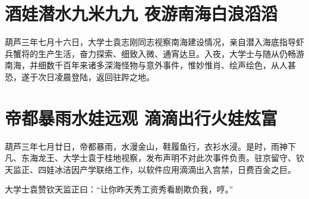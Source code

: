 \documentclass[12pt, a4paper]{book}
\begin{document}
\begin{CJK}{UTF8}{gbsn}
    \chapter{酒娃潜水九米九九 夜游南海白浪滔滔}
    
    葫芦三年七月十六日，大学士袁志刚同志视察南海建设情况，亲自潜入海底指导虾兵蟹将的生产生活，奋力探索、细致入微、通宵达旦。入夜，大学士与随从仍畅游南海，并细数千百年来诸多深海怪物与意外事件，惟妙惟肖、绘声绘色，从人甚恐，遂于次日凌晨登陆，返回驻跸之地。
    
    \chapter{帝都暴雨水娃远观 滴滴出行火娃炫富}
    
    葫芦三年七月廿日，帝都暴雨，水漫金山，鞋履鱼行，衣衫水浸。是时，雨神下凡、东海龙王、大学士袁于桂地视察，发布声明不对此次事件负责。驻京留守、钦天监正、四娃冰洁因产学联络工作，以软件应用滴滴出入宫禁，日费百金之巨。
    
    大学士袁赞钦天监正曰：“让你昨天秀工资秀看剧欺负我，哼。”
    
    \appendix

    

\end{CJK}
\end{document}
